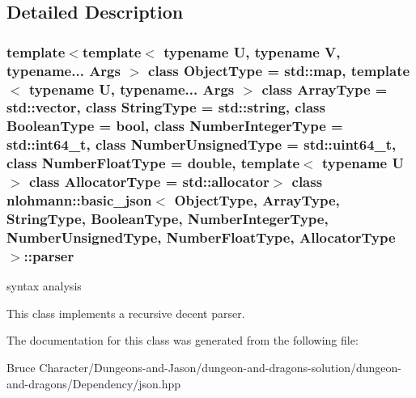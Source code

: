 \subsection{Detailed Description}
\subsubsection*{template$<$template$<$ typename U, typename V, typename... Args $>$ class Object\+Type = std\+::map, template$<$ typename U, typename... Args $>$ class Array\+Type = std\+::vector, class String\+Type = std\+::string, class Boolean\+Type = bool, class Number\+Integer\+Type = std\+::int64\+\_\+t, class Number\+Unsigned\+Type = std\+::uint64\+\_\+t, class Number\+Float\+Type = double, template$<$ typename U $>$ class Allocator\+Type = std\+::allocator$>$\newline
class nlohmann\+::basic\+\_\+json$<$ Object\+Type, Array\+Type, String\+Type, Boolean\+Type, Number\+Integer\+Type, Number\+Unsigned\+Type, Number\+Float\+Type, Allocator\+Type $>$\+::parser}

syntax analysis 

This class implements a recursive decent parser. 

The documentation for this class was generated from the following file\+:\begin{DoxyCompactItemize}
\item 
Bruce Character/\+Dungeons-\/and-\/\+Jason/dungeon-\/and-\/dragons-\/solution/dungeon-\/and-\/dragons/\+Dependency/json.\+hpp\end{DoxyCompactItemize}
